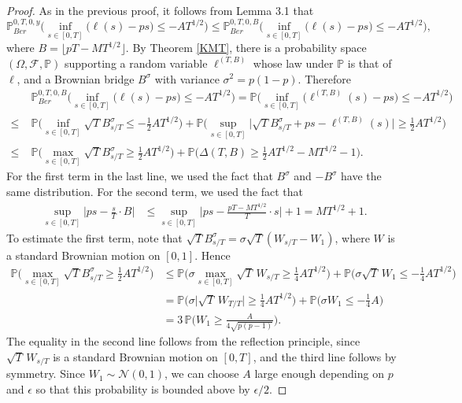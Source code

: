 \begin{proof}
	As in the previous proof, it follows from Lemma 3.1 that
	\[
	\mathbb{P}^{0,T,0,y}_{Ber}\Big( \inf_{s \in [ 0, T]}\big( \ell(s) -  ps \big) \leq -AT^{1/2} \Big) \leq \mathbb{P}^{0,T,0,B}_{Ber}\Big( \inf_{s \in [ 0, T]}\big( \ell(s) -  ps \big) \leq -AT^{1/2} \Big),
	\]
	where $B=\lfloor pT - MT^{1/2}\rfloor$. By Theorem \ref{KMT}, there is a probability space $(\Omega,\mathcal{F},\mathbb{P})$ supporting a random variable $\ell^{(T,B)}$ whose law under $\mathbb{P}$ is that of $\ell$, and a Brownian bridge $B^\sigma$ with variance $\sigma^2 = p(1-p)$. Therefore
	\begin{align*}
	&\mathbb{P}^{0,T,0,B}_{Ber}\Big( \inf_{s \in [ 0, T]}\big( \ell(s) -  ps \big) \leq -AT^{1/2} \Big) = \mathbb{P}\Big( \inf_{s \in [ 0, T]}\big( \ell^{(T,B)}(s) -  ps \big) \leq -AT^{1/2} \Big)\\
	\leq \; & \mathbb{P}\Big( \inf_{s \in [ 0, T]}  \sqrt{T}B^\sigma_{s/T} \leq -\frac{1}{2}AT^{1/2} \Big) + \mathbb{P}\Big( \sup_{s\in [0,T]} \Big|\sqrt{T} B^\sigma_{s/T} + ps - \ell^{(T,B)}(s) \Big| \geq \frac{1}{2}AT^{1/2} \Big)\\
	\leq \; & \mathbb{P}\Big( \max_{s\in[0,T]} \sqrt{T}B^\sigma_{s/T} \geq \frac{1}{2}AT^{1/2} \Big) + \mathbb{P}\Big(\Delta(T,B) \geq \frac{1}{2}AT^{1/2} - MT^{1/2} - 1\Big).
	\end{align*}
	For the first term in the last line, we used the fact that $B^\sigma$ and $-B^\sigma$ have the same distribution. For the second term, we used the fact that
	\begin{align*}
	\sup_{s\in[0,T]}\Big| ps - \frac{s}{T}\cdot B \Big| &\leq \sup_{s\in[0,T]}\Big| ps - \frac{pT-MT^{1/2}}{T}\cdot s \Big| + 1 = MT^{1/2} + 1.
	\end{align*} To estimate the first term, note that $\sqrt{T}B^\sigma_{s/T} = \sigma\sqrt{T}(W_{s/T} - W_1)$, where $W$ is a standard Brownian motion on $[0,1]$. Hence
	\begin{align*}
	\mathbb{P}\Big( \max_{s\in[0,T]} \sqrt{T}B^\sigma_{s/T} \geq \frac{1}{2}AT^{1/2} \Big) &\leq \mathbb{P}\Big( \sigma\max_{s\in[0,T]} \sqrt{T}\,W_{s/T} \geq \frac{1}{4}AT^{1/2} \Big) + \mathbb{P}\Big( \sigma\sqrt{T}\,W_1 \leq -\frac{1}{4}AT^{1/2} \Big)\\
	&= \mathbb{P}\Big( \sigma\big|\sqrt{T}\,W_{T/T}\big| \geq \frac{1}{4}AT^{1/2} \Big) + \mathbb{P}\Big( \sigma W_1 \leq -\frac{1}{4}A \Big)\\
	&= 3\,\mathbb{P}\Big( W_1 \geq \frac{A}{4\sqrt{p(p-1)}} \Big).
	\end{align*} 
	The equality in the second line follows from the reflection principle, since $\sqrt{T}\,W_{s/T}$ is a standard Brownian motion on $[0,T]$, and the third line follows by symmetry. Since $W_1\sim\mathcal{N}(0,1)$, we can choose $A$ large enough depending on $p$ and $\epsilon$ so that this probability is bounded above by $\epsilon/2$. 
	

\end{proof}
